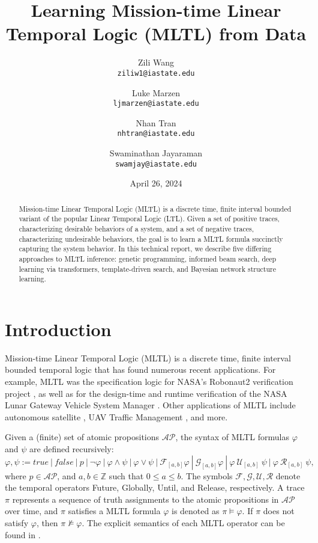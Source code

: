 \documentclass[12pt]{article}
\renewcommand{\phi}{\varphi}
\newcommand{\Until}{\ \mathcal{U}}         %
\newcommand{\Release}{\ \mathcal{R}}       %
\newcommand{\Globally}{\mathcal{G}}          %
\newcommand{\Finally}{\mathcal{F}}           %
\begin{document}
\title{\bf
\large Learning Mission-time Linear Temporal Logic (MLTL) from Data}

\author{
  Zili Wang\\
  \texttt{ziliw1@iastate.edu}
  \and
  Luke Marzen\\
  \texttt{ljmarzen@iastate.edu}
  \and
  Nhan Tran\\
  \texttt{nhtran@iastate.edu}
  \and
  Swaminathan Jayaraman\\
  \texttt{swamjay@iastate.edu}
}

\date{April 26, 2024}

\maketitle

\begin{abstract}
  Mission-time Linear Temporal Logic (MLTL) is a discrete time, finite interval bounded variant of the popular Linear Temporal Logic (LTL). 
  Given a set of positive traces, characterizing desirable behaviors of a system, and a set of negative traces, characterizing undesirable behaviors, the goal is to learn a MLTL formula succinctly capturing the system behavior.
  In this technical report, we describe five differing approaches to MLTL inference: genetic programming, informed beam search, deep learning via transformers, template-driven search, and Bayesian network structure learning.  
\end{abstract}

\section{Introduction}

Mission-time Linear Temporal Logic (MLTL) is a discrete time, finite interval bounded temporal logic that has found numerous recent applications. 
For example, MLTL was the specification logic for NASA's Robonaut2 verification project \cite{KZJZR20}, as well as for the design-time and runtime verification of the NASA Lunar Gateway Vehicle System Manager \cite{DBR21}.
Other applications of MLTL include autonomous satellite \cite{JAXA}, UAV Traffic Management \cite{HCHJR21}, and more. 

Given a (finite) set of atomic propositions $\mathcal{AP}$, the syntax of MLTL formulas $\phi$ and $\psi$ are defined recursively: 
$$ \phi, \psi := true \ | \ false \ | \ p \ | \ \neg \phi \ | \ \phi \land \psi \ | \ \phi \lor \psi \ | \ \Finally_{[a,b]} \phi \ | \ \Globally_{[a,b]} \phi \ | \ \phi \Until_{[a,b]}\ \psi \ | \ \phi \Release_{[a,b]}\ \psi, $$
where $p \in \mathcal{AP}$, and $a, b \in \mathbb{Z}$ such that $0 \leq a \leq b$. 
The symbols $\mathcal{F},\mathcal{G},\mathcal{U},\mathcal{R}$ denote the temporal operators Future, Globally, Until, and Release, respectively.
A trace $\pi$ represents a sequence of truth assignments to the atomic propositions in $\mathcal{AP}$ over time, and $\pi$ satisfies a MLTL formula $\phi$ is denoted as $\pi \models \phi$.
If $\pi$ does not satisfy $\phi$, then $\pi \not\models \phi$.
The explicit semantics of each MLTL operator can be found in \cite{WEST-iFM23}.
\end{document}
